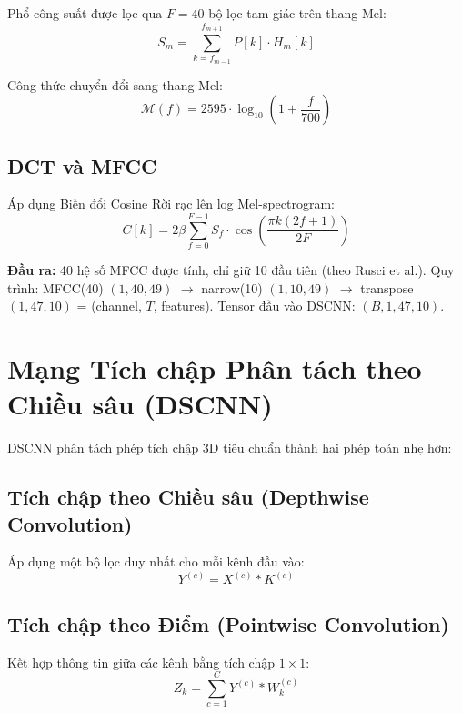 \documentclass[12pt,a4paper]{report}
\begin{document}
Phổ công suất được lọc qua $F = 40$ bộ lọc tam giác trên thang Mel:
\begin{equation}
    S_m = \sum_{k=f_{m-1}}^{f_{m+1}} P[k] \cdot H_m[k]
\end{equation}

Công thức chuyển đổi sang thang Mel:
\begin{equation}
    \mathcal{M}(f) = 2595 \cdot \log_{10}\left(1 + \frac{f}{700}\right)
\end{equation}

\subsection{DCT và MFCC}

Áp dụng Biến đổi Cosine Rời rạc lên log Mel-spectrogram:
\begin{equation}
    C[k] = 2\beta \sum_{f=0}^{F-1} S_f \cdot \cos\left(\frac{\pi k(2f+1)}{2F}\right)
\end{equation}

\textbf{Đầu ra:} 40 hệ số MFCC được tính, chỉ giữ 10 đầu tiên (theo Rusci et al.).
Quy trình: MFCC(40) $(1, 40, 49)$ $\rightarrow$ narrow(10) $(1, 10, 49)$ $\rightarrow$
transpose $(1, 47, 10)$ = (channel, $T$, features). Tensor đầu vào DSCNN: $(B, 1, 47, 10)$.


\section{Mạng Tích chập Phân tách theo Chiều sâu (DSCNN)}
\label{sec:dscnn_vi}

DSCNN phân tách phép tích chập 3D tiêu chuẩn thành hai phép toán nhẹ hơn:

\subsection{Tích chập theo Chiều sâu (Depthwise Convolution)}

Áp dụng một bộ lọc duy nhất cho mỗi kênh đầu vào:
\begin{equation}
    Y^{(c)} = X^{(c)} * K^{(c)}
\end{equation}

\subsection{Tích chập theo Điểm (Pointwise Convolution)}

Kết hợp thông tin giữa các kênh bằng tích chập $1 \times 1$:
\begin{equation}
    Z_k = \sum_{c=1}^{C} Y^{(c)} * W_k^{(c)}
\end{equation}
\end{document}
